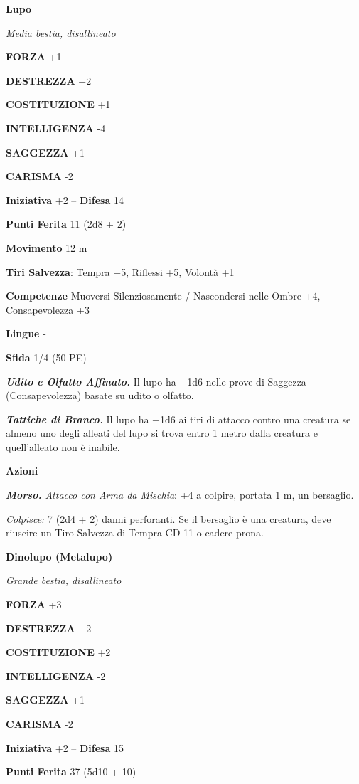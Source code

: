 \begin{multicols}{2}
\medskip\textbf{Lupo}

\emph{Media bestia, disallineato}

\textbf{FORZA} +1

\textbf{DESTREZZA} +2

\textbf{COSTITUZIONE} +1

\textbf{INTELLIGENZA} -4

\textbf{SAGGEZZA} +1

\textbf{CARISMA} -2

\textbf{Iniziativa} +2 -- \textbf{Difesa} 14

\textbf{Punti Ferita} 11 (2d8 + 2)

\textbf{Movimento} 12 m

\textbf{Tiri Salvezza}: Tempra +5, Riflessi +5, Volontà +1 

\textbf{Competenze} Muoversi Silenziosamente / Nascondersi nelle Ombre +4, Consapevolezza +3

\textbf{Lingue} -

\textbf{Sfida} 1/4 (50 PE)

\emph{\textbf{Udito e Olfatto Affinato.}} Il lupo ha +1d6 nelle prove di Saggezza (Consapevolezza) basate su udito o olfatto.

\emph{\textbf{Tattiche di Branco.}} Il lupo ha +1d6 ai tiri di attacco contro una creatura se almeno uno degli alleati del lupo si trova entro 1 metro dalla creatura e quell'alleato non è inabile.

\textbf{Azioni}

\emph{\textbf{Morso.} Attacco con Arma da Mischia}: +4 a colpire, portata 1 m, un bersaglio.

\emph{Colpisce:} 7 (2d4 + 2) danni perforanti. Se il bersaglio è una creatura, deve riuscire un Tiro Salvezza di Tempra CD 11 o cadere prona.

\medskip\textbf{Dinolupo (Metalupo)}

\emph{Grande bestia, disallineato}

\textbf{FORZA} +3

\textbf{DESTREZZA} +2

\textbf{COSTITUZIONE} +2

\textbf{INTELLIGENZA} -2

\textbf{SAGGEZZA} +1

\textbf{CARISMA} -2

\textbf{Iniziativa} +2 -- \textbf{Difesa} 15

\textbf{Punti Ferita} 37 (5d10 + 10)


\end{multicols}
